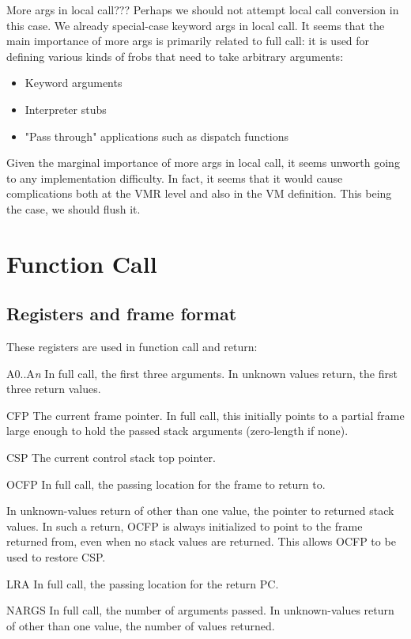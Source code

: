 More args in local call???  Perhaps we should not attempt local call conversion
in this case.  We already special-case keyword args in local call.  It seems
that the main importance of more args is primarily related to full call: it is
used for defining various kinds of frobs that need to take arbitrary arguments:
\begin{itemize}
\item Keyword arguments
\item Interpreter stubs
\item "Pass through" applications such as dispatch functions
\end{itemize}
Given the marginal importance of more args in local call, it seems unworth
going to any implementation difficulty.  In fact, it seems that it would cause
complications both at the VMR level and also in the VM definition.  This being
the case, we should flush it.


\section{Function Call}



\subsection{Registers and frame format}

These registers are used in function call and return:

A0..A{\it n}
    In full call, the first three arguments.  In unknown values return, the
    first three return values.

CFP
    The current frame pointer.  In full call, this initially points to a
    partial frame large enough to hold the passed stack arguments (zero-length
    if none).

CSP
    The current control stack top pointer. 

OCFP
    In full call, the passing location for the frame to return to.

    In unknown-values return of other than one value, the pointer to returned
    stack values.  In such a return, OCFP is always initialized to point to
    the frame returned from, even when no stack values are returned.  This
    allows OCFP to be used to restore CSP.

LRA
    In full call, the passing location for the return PC.

NARGS
    In full call, the number of arguments passed.  In unknown-values return of
    other than one value, the number of values returned.

